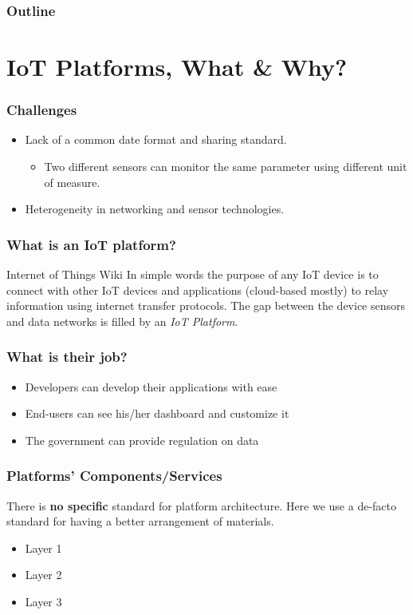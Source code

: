 \documentclass{../iot-lecture}
\subtitle{IoT Platforms}
\begin{document}
\begin{frame}
  \titlepage{}
\end{frame}
\begin{frame}
  \frametitle{Outline}
  \tableofcontents{}
\end{frame}

\section{IoT Platforms, What \& Why?}

\begin{frame}
  \frametitle{Challenges}
  \begin{itemize}
    \item Lack of a common date format and sharing standard.
    \begin{itemize}
      \item Two different sensors can monitor the same parameter using different unit of measure.
    \end{itemize}
    \item Heterogeneity in networking and sensor technologies.
  \end{itemize}
\end{frame}

\begin{frame}
  \frametitle{What is an IoT platform?}
  \begin{block}{Internet of Things Wiki}
    In simple words the purpose of any IoT device is to connect with
    other IoT devices and applications (cloud-based mostly) to relay
    information using internet transfer protocols.
    The gap between the device sensors and data networks is filled
    by an \textit{\color{Green} IoT Platform}.
  \end{block}
\end{frame}

\begin{frame}
  \frametitle{What is their job?}
  \begin{itemize}
    \item Developers can develop their applications with ease
    \item End-users can see his/her dashboard and customize it
    \item The government can provide regulation on data
  \end{itemize}
\end{frame}

\begin{frame}
  \frametitle{Platforms' Components/Services}
  \begin{block}{}
    There is \textbf{no specific} standard for platform architecture.
    Here we use a de-facto standard for having a better arrangement of materials.
  \end{block}
  \begin{itemize}
    \item Layer 1
    \item Layer 2
    \item Layer 3
  \end{itemize}
\end{frame}
\end{document}
